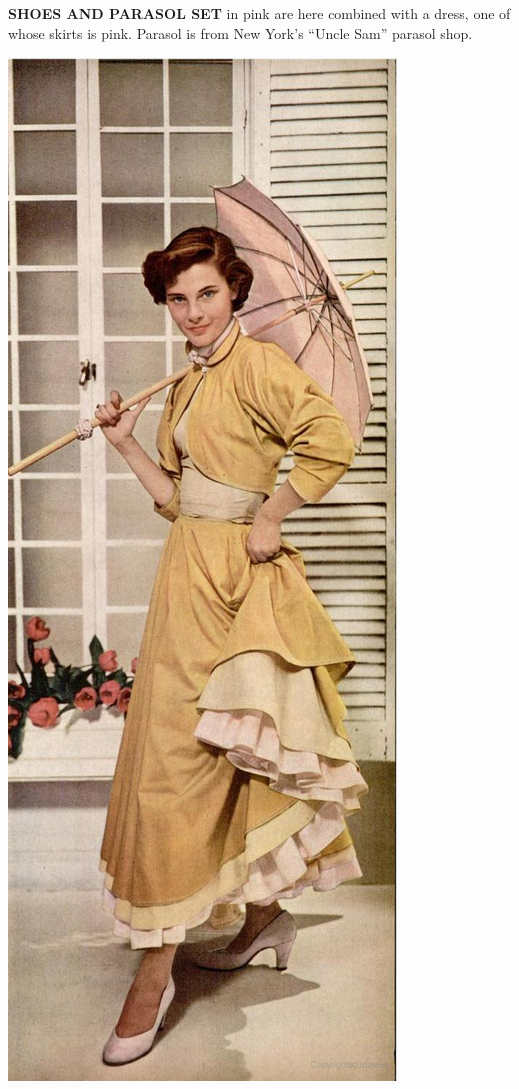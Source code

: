 \begin{minipage}{\textwidth}
\begin{minipage}[b][\textheight][b]{.47\linewidth}
\textbf{SHOES AND PARASOL SET} in pink are here combined with a dress, one of whose skirts is pink. Parasol is from New York's ``Uncle Sam'' parasol shop.
\end{minipage}\hspace*{1cm}
\begin{minipage}[b]{.53\linewidth}
\mbox{}
\includegraphics[width=\linewidth]{./images/parasol-01.jpg}\par
\end{minipage}
\end{minipage}


\clearpage